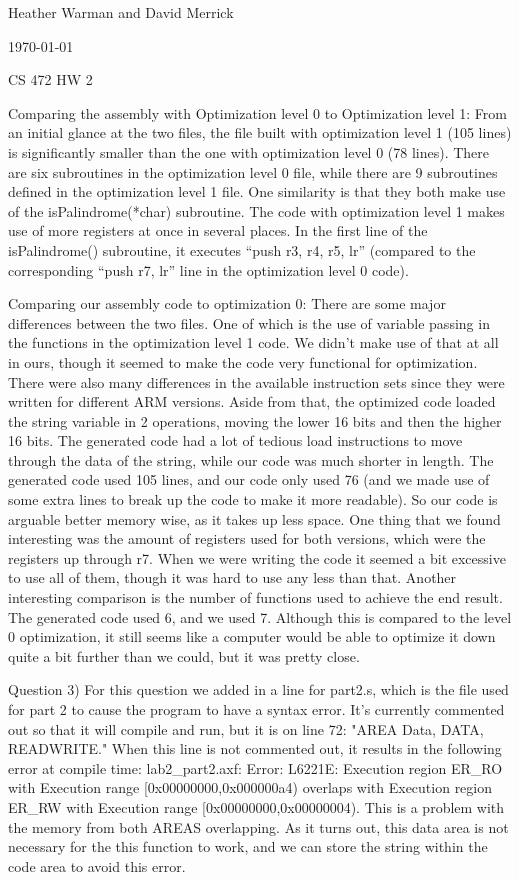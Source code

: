 \documentclass[letterpaper,10pt,titlepage]{article}
\def\name{Heather Warman and David Merrick}
\begin{document}
\hfill \name

\hfill \today

\hfill CS 472 HW 2



Comparing the assembly with Optimization level 0 to Optimization level 1: 
From an initial glance at the two files, the file built with optimization level 1 (105 lines) is significantly smaller than the one with optimization level 0 (78 lines). There are six subroutines in the optimization level 0 file, while there are 9 subroutines defined in the optimization level 1 file. One similarity is that they both make use of the isPalindrome(*char) subroutine. The code with optimization level 1 makes use of more registers at once in several places. In the first line of the isPalindrome() subroutine, it executes “push {r3, r4, r5, lr}” (compared to the corresponding “push {r7, lr}” line in the optimization level 0 code).


Comparing our assembly code to optimization 0:
There are some major differences between the two files. One of which is the use of variable passing in the functions in the optimization level 1 code. We didn’t make use of that at all in ours, though it seemed to make the code very functional for optimization. There were also many differences in the available instruction sets since they were written for different ARM versions. Aside from that, the optimized code loaded the string variable in 2 operations, moving the lower 16 bits and then the higher 16 bits. The generated code had a lot of tedious load instructions to move through the data of the string, while our code was much shorter in length. The generated code used 105 lines, and our code only used 76 (and we made use of some extra lines to break up the code to make it more readable). So our code is arguable better memory wise, as it takes up less space. One thing that we found interesting was the amount of registers used for both versions, which were the registers up through r7. When we were writing the code it seemed a bit excessive to use all of them, though it was hard to use any less than that. Another interesting comparison is the number of functions used to achieve the end result. The generated code used 6, and we used 7. Although this is compared to the level 0 optimization, it still seems like a computer would be able to optimize it down quite a bit further than we could, but it was pretty close.


Question 3) For this question we added in a line for part2.s, which is the file used for part 2 to cause the program to have a syntax error. It's currently commented out so that it will compile and run, but it is on line 72: "AREA Data, DATA, READWRITE." When this line is not commented out, it results in the following error at compile time: lab2\_part2.axf: Error: L6221E: Execution region ER\_RO with Execution range [0x00000000,0x000000a4) overlaps with Execution region ER\_RW with Execution range [0x00000000,0x00000004). This is a problem with the memory from both AREAS overlapping. As it turns out, this data area is not necessary for the this function to work, and we can store the string within the code area to avoid this error.
\end{document}
